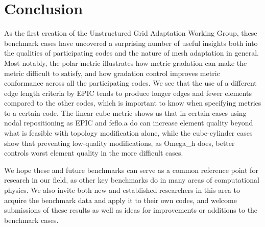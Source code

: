 \documentclass[3p,times,procedia,number]{elsarticle}
\begin{document}
\section{Conclusion}

As the first creation of the Unstructured Grid Adaptation Working Group, these benchmark cases have uncovered
a surprising number of useful insights both into the qualities of participating codes and the
nature of mesh adaptation in general.
Most notably, the polar metric illustrates how metric gradation can make the metric difficult to satisfy,
and how gradation control improves metric conformance across all the participating codes.
We see that the use of a different edge length criteria by EPIC tends to produce longer edges
and fewer elements compared to the other codes,
which is important to know when specifying metrics to a certain code.
The linear cube metric shows us that in certain cases using nodal repositioning as EPIC and feflo.a do can increase element quality
beyond what is feasible with topology modification alone,
while the cube-cylinder cases show that preventing low-quality modifications, as Omega\_h does, better
controls worst element quality in the more difficult cases.

We hope these and future benchmarks can serve as a common reference point for research in our field,
as other key benchmarks do in many areas of computational physics.
We also invite both new and established researchers in this area to acquire the benchmark data
and apply it to their own codes, and welcome submissions of these results as well
as ideas for improvements or additions to the benchmark cases.



\end{document}
